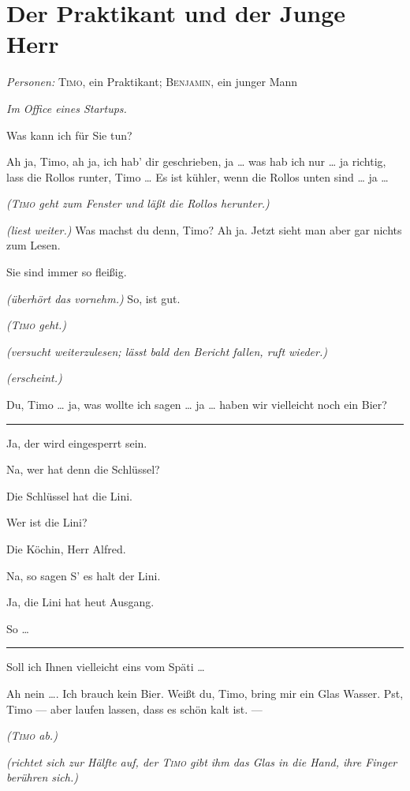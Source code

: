 \documentclass[
	final,
	a4paper,
	ngerman,
	mpinclude = true, %
	twoside = true,
	open = right,
	cleardoublepage = plain,
	DIV = 13,
	BCOR = 1cm,
	titlepage = firstiscover,
	]{scrbook}
\newcommand{\scene}{\section}
\newcommand{\direction}[1]{\textit{(#1)}}
\newcommand{\setting}[1]{\vspace{-0.5\baselineskip}\centering\textit{#1}}
\newenvironment{deletion}{%
		\vspace{0.25\baselineskip}
		\hrule
		\vspace{0.25\baselineskip}
		\color{darkgray}
	}{
		\color{black}
		\vspace{0.25\baselineskip}
		\hrule 
		\vspace{0.25\baselineskip}
	}
\newcommand{\characterlist}[1]{{\begin{center}\textit{Personen:} #1\end{center}}}
\newcommand{\thecharacter}[1]{\textup{\textsc{#1}}\xspace}
\newcommand{\thepraktikant}{\thecharacter{Timo}}
\newcommand{\theherr}{\thecharacter{Benjamin}}
\newcommand{\character}[1]{\item[#1:]}
\newcommand{\praktikant}{\character{\thepraktikant}}
\newcommand{\herr}{\character{\theherr}}
\begin{document}
\scene{Der Praktikant und der Junge Herr}
\characterlist{\thepraktikant, ein Praktikant; \theherr, ein junger Mann}
\setting{Im Office eines Startups.}
\begin{play}
	\praktikant
	Was kann ich für Sie tun?

	\herr
	Ah ja, Timo, ah ja, ich hab' dir geschrieben, ja \ldots{} was hab ich nur \ldots{} ja richtig, lass die Rollos runter, Timo \ldots{} Es ist kühler, wenn die Rollos unten sind \ldots{} ja \ldots{}

	\direction{\thepraktikant geht zum Fenster und läßt die Rollos herunter.}

	\herr
	\direction{liest weiter.} Was machst du denn, Timo? Ah ja. Jetzt sieht man aber gar nichts zum Lesen.

	\praktikant
	Sie sind immer so fleißig.

	\herr
	\direction{überhört das vornehm.} So, ist gut.

	\direction{\thepraktikant geht.}

	\herr
	\direction{versucht weiterzulesen; lässt bald den Bericht fallen, ruft wieder.}

	\praktikant
	\direction{erscheint.}

	\herr
	Du, Timo \ldots{} ja, was wollte ich sagen \ldots{} ja \ldots{} haben wir vielleicht noch ein Bier?

	\begin{deletion}
	\praktikant
	Ja, der wird eingesperrt sein.

	\herr
	Na, wer hat denn die Schlüssel?

	\praktikant
	Die Schlüssel hat die Lini.

	\herr
	Wer ist die Lini?

	\praktikant
	Die Köchin, Herr Alfred.

	\herr
	Na, so sagen S' es halt der Lini.

	\praktikant
	Ja, die Lini hat heut Ausgang.

	\herr
	So \ldots{}
	\end{deletion}

	\praktikant
	Soll ich Ihnen vielleicht eins vom Späti \ldots{}

	\herr
	Ah nein \ldots{}. Ich brauch kein Bier. Weißt du, Timo, bring mir ein Glas Wasser. Pst, Timo --- aber laufen lassen, dass es schön kalt ist. ---

	\direction{\thepraktikant{} ab.}

	\herr
	\direction{richtet sich zur Hälfte auf, der \thepraktikant{} gibt ihm das Glas in die Hand, ihre Finger berühren sich.}


\end{play}
\end{document}
